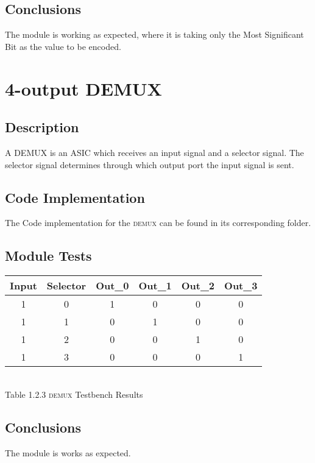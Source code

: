 \documentclass[a4paper,12pt]{article}
\begin{document}
\subsection{Conclusions}
The module is working as expected, where it is taking only the Most Significant Bit as the value to be encoded.

\section{4-output DEMUX}

\subsection{Description}
A DEMUX is an ASIC which receives an input signal and a selector signal. The selector signal determines through which output port the input signal is sent.

\subsection{Code Implementation}
The Code implementation for the \textsc{demux} can be found in its  corresponding folder.

\subsection{Module Tests}

\begin{center}
\begin{tabular}{|c|c|c|c|c|c|}
\hline
Input&Selector&Out\_0&Out\_1&Out\_2&Out\_3\\
\hline
1&0&1&0&0&0\\
1&1&0&1&0&0\\
1&2&0&0&1&0\\
1&3&0&0&0&1\\
\hline
\end{tabular}
\\\vspace{12pt}
Table 1.2.3 \textsc{demux} Testbench Results
\end{center}

\subsection{Conclusions}
The module is works as expected.
\end{document}
